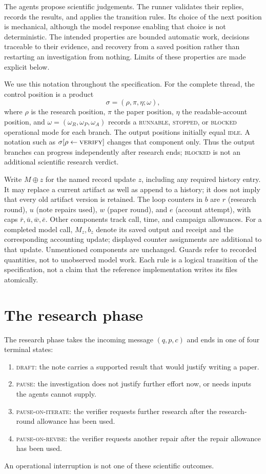 \documentclass[11pt,a4paper]{article}
\newcommand{\st}[1]{\textsc{#1}}
\begin{document}
The agents propose scientific judgements. The runner validates their replies,
records the results, and applies the transition rules. Its choice of the next
position is mechanical, although the model response enabling that choice is not
deterministic. The intended properties are bounded automatic work, decisions
traceable to their evidence, and recovery from a saved position rather than
restarting an investigation from nothing. Limits of these properties are made
explicit below.

We use this notation throughout the specification. For the complete thread, the
control position is a product
\[
 \sigma=(\rho,\pi,\eta;\omega),
\]
where \(\rho\) is the research position, \(\pi\) the paper position, \(\eta\)
the readable-account position, and \(\omega=(\omega_R,\omega_P,\omega_A)\)
records a \st{runnable}, \st{stopped}, or \st{blocked} operational mode for each
branch. The output positions initially equal \st{idle}. A notation such as
\(\sigma[\rho\leftarrow\st{verify}]\) changes that component only. Thus the
output branches can progress independently after research ends; \st{blocked} is
not an additional scientific research verdict.

Write \(M\oplus z\) for the named record update \(z\), including any required
history entry. It may replace a current artifact as well as append to a history;
it does not imply that every old artifact version is retained. The loop counters
in \(b\) are \(r\) (research round), \(u\) (note repairs used), \(w\) (paper
round), and \(e\) (account attempt), with caps \(\bar r,\bar u,\bar w,\bar e\).
Other components track call, time, and campaign allowances. For a completed
model call, \(M_z,b_z\) denote its saved output and receipt and the
corresponding accounting update; displayed counter assignments are additional to
that update. Unmentioned components are unchanged. Guards refer to recorded
quantities, not to unobserved model work. Each rule is a logical transition of
the specification, not a claim that the reference implementation writes its
files atomically.

\section{The research phase}

The research phase takes the incoming message \((q,p,c)\) and ends in one of
four terminal states:
\begin{enumerate}
\item \st{draft}: the note carries a supported result that would justify writing
a paper.
\item \st{pause}: the investigation does not justify further effort now, or
needs inputs the agents cannot supply.
\item \st{pause-on-iterate}: the verifier requests further research after the
research-round allowance has been used.
\item \st{pause-on-revise}: the verifier requests another repair after the
repair allowance has been used.
\end{enumerate}
An operational interruption is not one of these scientific outcomes.
\end{document}

